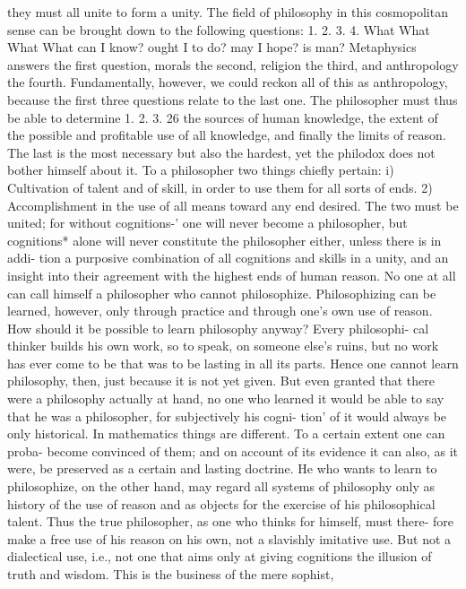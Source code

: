 they must all unite to form a unity.
The field of philosophy in this cosmopolitan sense can be brought
down to the following questions:
1.
2.
3.
4.
What
What
What
What
can I know?
ought I to do?
may I hope?
is man?
Metaphysics answers the first question, morals the second, religion the
third, and anthropology the fourth. Fundamentally, however, we could
reckon all of this as anthropology, because the first three questions relate
to the last one.
The philosopher must thus be able to determine
1.
2.
3.
26
the sources of human knowledge,
the extent of the possible and profitable use of all knowledge, and finally
the limits of reason.
The last is the most necessary but also the hardest, yet the philodox
does not bother himself about it.
To a philosopher two things chiefly pertain: i) Cultivation of talent and
of skill, in order to use them for all sorts of ends. 2) Accomplishment in
the use of all means toward any end desired. The two must be united; for
without cognitions-' one will never become a philosopher, but cognitions*
alone will never constitute the philosopher either, unless there is in addi-
tion a purposive combination of all cognitions and skills in a unity, and an
insight into their agreement with the highest ends of human reason.
No one at all can call himself a philosopher who cannot philosophize.
Philosophizing can be learned, however, only through practice and
through one's own use of reason.
How should it be possible to learn philosophy anyway? Every philosophi-
cal thinker builds his own work, so to speak, on someone else's ruins, but
no work has ever come to be that was to be lasting in all its parts. Hence
one cannot learn philosophy, then, just because it is not yet given. But even
granted that there were a philosophy actually at hand, no one who learned it
would be able to say that he was a philosopher, for subjectively his cogni-
tion' of it would always be only historical.
In mathematics things are different. To a certain extent one can proba-
become convinced of them; and on account of its evidence it can also, as it
were, be preserved as a certain and lasting doctrine.
He who wants to learn to philosophize, on the other hand, may regard
all systems of philosophy only as history of the use of reason and as objects
for the exercise of his philosophical talent.
Thus the true philosopher, as one who thinks for himself, must there-
fore make a free use of his reason on his own, not a slavishly imitative use.
But not a dialectical use, i.e., not one that aims only at giving cognitions the
illusion of truth and wisdom. This is the business of the mere sophist,
